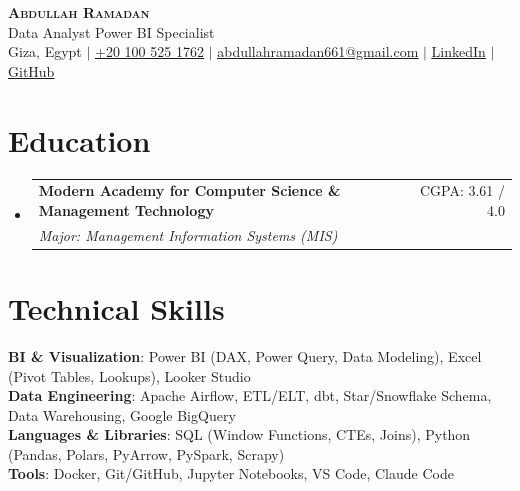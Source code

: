 \documentclass[letterpaper,11pt]{article}
\makeatletter
\newcommand{\resumeSubheading}[4]{
  \vspace{-2pt}\item
    \begin{tabular*}{0.97\textwidth}[t]{l@{\extracolsep{\fill}}r}
      \textbf{#1} & #2 \\
      \textit{\small#3} & \textit{\small #4} \\
    \end{tabular*}\vspace{-7pt}
}
\newcommand{\resumeSubHeadingListStart}{\begin{itemize}[leftmargin=0.15in, label={}]}
\newcommand{\resumeSubHeadingListEnd}{\end{itemize}}
\makeatother
\begin{document}
\begin{center}
    \textbf{\Huge \scshape Abdullah Ramadan} \\ \vspace{3pt}
    \large Data Analyst \textbar{} Power BI Specialist \\ \vspace{3pt}
    \small Giza, Egypt $|$
    \href{tel:+201005251762}{\underline{+20 100 525 1762}} $|$
    \href{mailto:abdullahramadan661@gmail.com}{\underline{abdullahramadan661@gmail.com}} $|$
    \href{https://www.linkedin.com/in/abdullah-ramadan661/}{\underline{LinkedIn}} $|$
    \href{https://github.com/Abdullah-Essam21}{\underline{GitHub}}
\end{center}

\section{Education}
  \resumeSubHeadingListStart
    \resumeSubheading
      {Modern Academy for Computer Science \& Management Technology}{CGPA: 3.61 / 4.0}
      {Major: Management Information Systems (MIS)}{}
  \resumeSubHeadingListEnd

\section{Technical Skills}
 \begin{itemize}[leftmargin=0.15in, label={}]
    \small{\item{
     \textbf{BI \& Visualization}{: Power BI (DAX, Power Query, Data Modeling), Excel (Pivot Tables, Lookups), Looker Studio} \\
     \textbf{Data Engineering}{: Apache Airflow, ETL/ELT, dbt, Star/Snowflake Schema, Data Warehousing, Google BigQuery} \\
     \textbf{Languages \& Libraries}{: SQL (Window Functions, CTEs, Joins), Python (Pandas, Polars, PyArrow, PySpark, Scrapy)} \\
     \textbf{Tools}{: Docker, Git/GitHub, Jupyter Notebooks, VS Code, Claude Code}
    }}
 \end{itemize}

\end{document}
